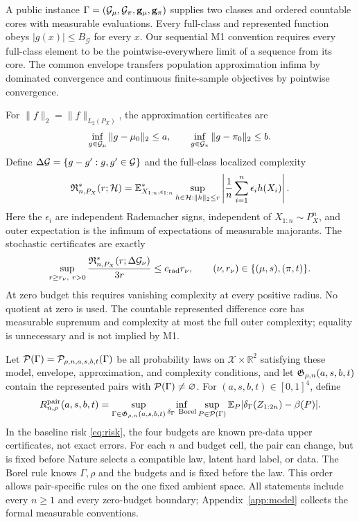 \documentclass{article}
\theoremstyle{definition}
\theoremstyle{remark}
\begin{document}
A public instance \(\Gamma=(\mathcal G_\mu,\mathcal G_\pi,\mathbf g_\mu,\mathbf g_\pi)\) supplies two classes and ordered countable cores with measurable evaluations. Every full-class and represented function obeys \(|g(x)|\le B_{\mathcal G}\) for every \(x\). Our sequential M1 convention requires every full-class element to be the pointwise-everywhere limit of a sequence from its core. The common envelope transfers population approximation infima by dominated convergence and continuous finite-sample objectives by pointwise convergence.

For \(\|f\|_2=\|f\|_{L_2(P_X)}\), the approximation certificates are
\begin{equation}
 \inf_{g\in\mathcal G_\mu}\|g-\mu_0\|_2\le a,\qquad
 \inf_{g\in\mathcal G_\pi}\|g-\pi_0\|_2\le b.
 \label{eq:approx}
\end{equation}
Define \(\Delta\mathcal G=\{g-g':g,g'\in\mathcal G\}\) and the full-class localized complexity
\[
 \mathfrak R^*_{n,P_X}(r;\mathcal H)
 =\mathbb E^*_{X_{1:n},\epsilon_{1:n}}
 \sup_{h\in\mathcal H:\|h\|_2\le r}
 \left|\frac1n\sum_{i=1}^n\epsilon_i h(X_i)\right|.
\]
Here the \(\epsilon_i\) are independent Rademacher signs, independent of \(X_{1:n}\sim P_X^n\), and outer expectation is the infimum of expectations of measurable majorants. The stochastic certificates are exactly
\[
 \sup_{r\ge r_\nu,\ r>0}
 \frac{\mathfrak R^*_{n,P_X}(r;\Delta\mathcal G_\nu)}{3r}
 \le c_{\rm rad}r_\nu,
 \qquad (\nu,r_\nu)\in\{(\mu,s),(\pi,t)\}.
\]
At zero budget this requires vanishing complexity at every positive radius. No quotient at zero is used. The countable represented difference core has measurable supremum and complexity at most the full outer complexity; equality is unnecessary and is not implied by M1.

Let \(\mathcal P(\Gamma)=\mathcal P_{\rho,n,a,s,b,t}(\Gamma)\) be all probability laws on \(\mathcal X\times\mathbb R^2\) satisfying these model, envelope, approximation, and complexity conditions, and let \(\mathfrak G_{\rho,n}(a,s,b,t)\) contain the represented pairs with \(\mathcal P(\Gamma)\ne\varnothing\). For \((a,s,b,t)\in[0,1]^4\), define
\begin{equation}
R^{\mathrm{pair}}_{n,\rho}(a,s,b,t)=
\sup_{\Gamma\in\mathfrak G_{\rho,n}(a,s,b,t)}
\inf_{\delta_\Gamma\ {\rm Borel}}
\sup_{P\in\mathcal P(\Gamma)}
\mathbb E_P\lvert \delta_\Gamma(Z_{1:2n})-\beta(P)\rvert.
\label{eq:risk}
\end{equation}
In the baseline risk \eqref{eq:risk}, the four budgets are known pre-data upper certificates, not exact errors. For each \(n\) and budget cell, the pair can change, but is fixed before Nature selects a compatible law, latent hard label, or data. The Borel rule knows \(\Gamma,\rho\) and the budgets and is fixed before the law. This order allows pair-specific rules on the one fixed ambient space. All statements include every \(n\ge1\) and every zero-budget boundary; Appendix~\ref{app:model} collects the formal measurable conventions.
\end{document}
